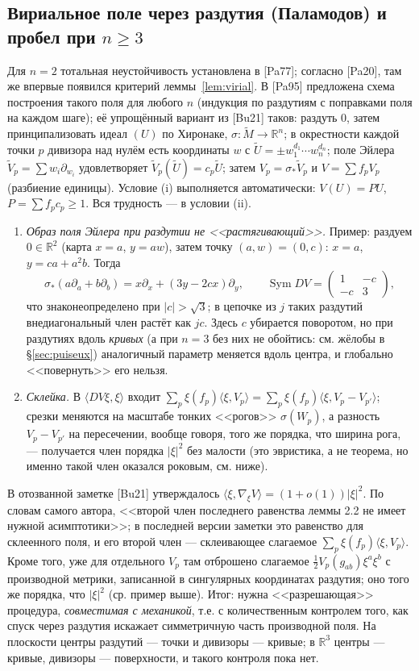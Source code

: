 \documentclass[11pt,a4paper]{article}
\theoremstyle{definition}
\newcommand{\R}{\mathbb R}
\DeclareMathOperator{\Sym}{Sym}
\begin{document}
\subsection{Вириальное поле через раздутия (Паламодов) и пробел при $n\ge3$}\label{sec:resolution}
Для $n=2$ тотальная неустойчивость установлена в [Pa77]; согласно [Pa20], там же впервые появился
критерий леммы~\ref{lem:virial}. В [Pa95] предложена схема построения такого поля для любого $n$
(индукция по раздутиям с поправками поля на каждом шаге); её упрощённый вариант из [Bu21] таков: раздуть $0$, затем принципализовать идеал
$(U)$ по Хиронаке, $\sigma\colon\widetilde M\to\R^n$; в окрестности каждой точки $p$ дивизора над нулём
есть координаты $w$ с $\widetilde U=\pm w_1^{d_1}\cdots w_n^{d_n}$; поле Эйлера
$\widetilde V_p=\sum w_i\partial_{w_i}$ удовлетворяет $\widetilde V_p(\widetilde U)=c_p\widetilde U$; затем
$V_p=\sigma_*\widetilde V_p$ и $V=\sum f_pV_p$ (разбиение единицы). Условие (i) выполняется
автоматически: $V(U)=PU$, $P=\sum f_pc_p\ge1$. Вся трудность --- в условии (ii).
\begin{enumerate}[leftmargin=*]
\item \emph{Образ поля Эйлера при раздутии не <<растягивающий>>.} Пример: раздуем $0\in\R^2$ (карта
$x=a$, $y=aw$), затем точку $(a,w)=(0,c)$: $x=a$, $y=ca+a^2b$. Тогда
\[
\sigma_*(a\partial_a+b\partial_b)=x\partial_x+(3y-2cx)\partial_y,\qquad
\Sym DV=\begin{pmatrix}1&-c\\-c&3\end{pmatrix},
\]
что знаконеопределено при $|c|>\sqrt3$; в цепочке из $j$ таких раздутий внедиагональный член растёт
как $jc$. Здесь $c$ убирается поворотом, но при раздутиях вдоль \emph{кривых} (а при $n=3$ без них не
обойтись: см. жёлобы в \S\ref{sec:puiseux}) аналогичный параметр меняется вдоль центра, и глобально
<<повернуть>> его нельзя.
\item \emph{Склейка.} В $\langle DV\xi,\xi\rangle$ входит
$\sum_p\xi(f_p)\langle\xi,V_p\rangle=\sum_p\xi(f_p)\langle\xi,V_p-V_{p'}\rangle$; срезки меняются на
масштабе тонких <<рогов>> $\sigma(W_p)$, а разность $V_p-V_{p'}$ на пересечении, вообще говоря, того же
порядка, что ширина рога, --- получается член порядка $|\xi|^2$ без малости (это эвристика, а не
теорема, но именно такой член оказался роковым, см. ниже).
\end{enumerate}
В отозванной заметке [Bu21] утверждалось $\langle\xi,\nabla_\xi V\rangle=(1+o(1))|\xi|^2$. По словам самого
автора, <<второй член последнего равенства леммы 2.2 не имеет нужной асимптотики>>; в последней версии
заметки это равенство для склеенного поля, и его второй член --- склеивающее слагаемое
$\sum_p\xi(f_p)\langle\xi,V_p\rangle$. Кроме того, уже для отдельного $V_p$ там отброшено слагаемое
$\frac12V_p(g_{ab})\xi^a\xi^b$ с производной метрики, записанной в сингулярных координатах раздутия; оно
того же порядка, что $|\xi|^2$ (ср. пример выше). Итог: нужна <<разрешающая>> процедура,
\emph{совместимая с механикой}, т.е. с количественным контролем того, как спуск через раздутия искажает
симметричную часть производной поля. На плоскости центры раздутий --- точки и дивизоры --- кривые;
в $\R^3$ центры --- кривые, дивизоры --- поверхности, и такого контроля пока нет.
\end{document}
